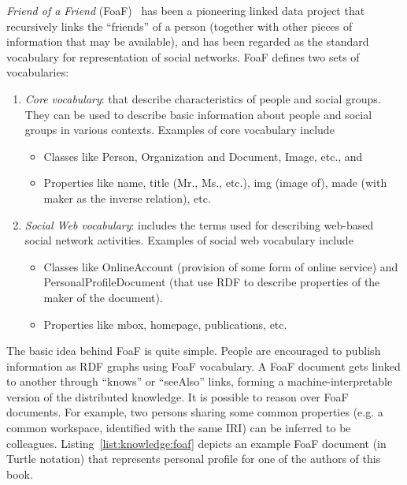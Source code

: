 {\em Friend of a Friend} (FoaF)~\citep{Graves:2007} has been a pioneering linked data project that recursively links the 
``friends'' of a person (together with other pieces of information that may be available), and has been regarded as the 
standard vocabulary for representation of social networks. FoaF defines two sets of vocabularies:
 
\begin{enumerate}
	\item {\em Core vocabulary}: that describe characteristics of people and social groups. They can be used to describe basic 
		information about people and social groups in various contexts. Examples of core vocabulary include
		\begin{itemize}
			\item Classes like Person, Organization and Document, Image, etc., and
			\item Properties like name, title (Mr., Ms., etc.), img (image of), made (with maker as the inverse
				relation), etc.
		\end{itemize}
	\item {\em Social Web vocabulary}: includes the terms used for describing web-based social network activities. Examples of social 
		web vocabulary include
		\begin{itemize}
			\item Classes like OnlineAccount (provision of some form of online service) and PersonalProfileDocument
				(that use RDF to describe properties of the maker of the document).
			\item Properties like mbox, homepage, publications, etc.
		\end{itemize}
\end{enumerate}

The basic idea behind FoaF is quite simple. People are encouraged to publish information as RDF graphs using FoaF vocabulary. 
A FoaF document gets linked to another through ``knows'' or ``seeAlso'' links, forming a machine-interpretable version of the 
distributed knowledge.  
%
It is possible to reason over FoaF documents. For example, two persons sharing some common properties (e.g. a common workspace,
identified with the same IRI) can be inferred to be colleagues. Listing~\ref{list:knowledge:foaf} depicts an example FoaF document 
(in Turtle notation) that represents personal profile for one of the authors of this book.

